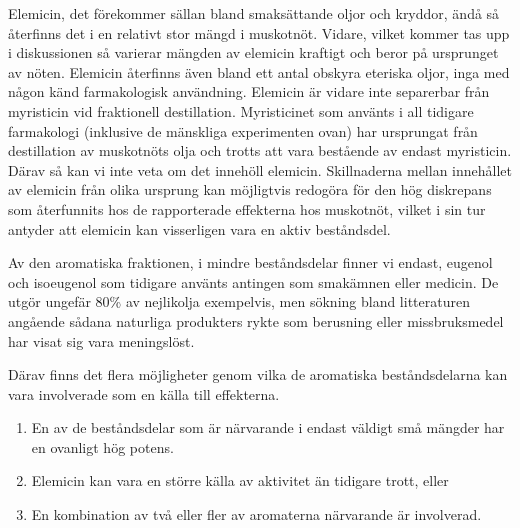 \documentclass{theme/franska}
\begin{document}
{Elemicin, det förekommer sällan bland smaksättande oljor och kryddor, ändå så
återfinns det i en relativt stor mängd i muskotnöt. Vidare, vilket kommer tas upp i diskussionen så varierar mängden av elemicin kraftigt och beror på ursprunget av nöten. Elemicin återfinns även bland ett antal obskyra eteriska oljor, inga med någon känd farmakologisk användning. Elemicin är vidare inte separerbar från myristicin vid fraktionell destillation. Myristicinet som använts i all tidigare farmakologi (inklusive de mänskliga experimenten ovan) har ursprungat från destillation av muskotnöts olja och trotts att vara bestående av endast myristicin. Därav så kan vi inte veta om det innehöll elemicin.
Skillnaderna mellan innehållet av elemicin från olika ursprung kan möjligtvis redogöra för den hög diskrepans som återfunnits hos de rapporterade effekterna hos muskotnöt, vilket i sin tur antyder att elemicin kan visserligen vara en aktiv beståndsdel.

Av den aromatiska fraktionen, i mindre beståndsdelar finner vi endast, eugenol och isoeugenol som tidigare använts antingen som smakämnen eller medicin.
De utgör ungefär 80\% av nejlikolja exempelvis, men sökning bland litteraturen angående sådana naturliga produkters rykte som berusning eller missbruksmedel har visat sig vara meningslöst.

Därav finns det flera möjligheter genom vilka de aromatiska beståndsdelarna kan vara involverade som en källa till effekterna.
\begin{enumerate}
	\setlength\itemsep{0em}
\item En av de beståndsdelar som är närvarande i endast väldigt små mängder har en ovanligt hög potens.
\item Elemicin kan vara en större källa av aktivitet än tidigare trott, eller
\item En kombination av två eller fler av aromaterna närvarande är involverad.
\end{enumerate}





}
\end{document}
